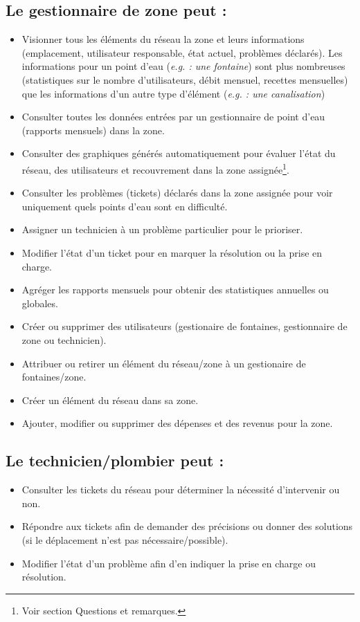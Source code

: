\documentclass[a4paper, 11pt]{article}
\begin{document}
\subsection{Le gestionnaire de zone peut :}
\begin{itemize}
  \item Visionner tous les éléments du réseau la zone et leurs informations (emplacement, utilisateur responsable, état actuel, problèmes déclarés). Les informations pour un point d'eau (\emph{e.g. : une fontaine}) sont plus nombreuses (statistiques sur le nombre d'utilisateurs, débit mensuel, recettes mensuelles) que les informations d'un autre type d'élément (\emph{e.g. : une canalisation})
  \item Consulter toutes les données entrées par un gestionnaire de point d'eau (rapports mensuels) dans la zone.
  \item Consulter des graphiques générés automatiquement pour évaluer l'état du réseau, des utilisateurs et recouvrement dans la zone assignée\footnote{Voir section Questions et remarques.}.
  \item Consulter les problèmes (tickets) déclarés dans la zone assignée pour voir uniquement quels points d'eau sont en difficulté.
  \item Assigner un technicien à un problème particulier pour le prioriser.
  \item Modifier l'état d'un ticket pour en marquer la résolution ou la prise en charge.
  \item Agréger les rapports mensuels pour obtenir des statistiques annuelles ou globales. %
  \item Créer ou supprimer des utilisateurs (gestionaire de fontaines, gestionnaire de zone ou technicien). %
  \item Attribuer ou retirer un élément du réseau/zone à un gestionaire de fontaines/zone.
  \item Créer un élément du réseau dans sa zone.
  \item Ajouter, modifier ou supprimer des dépenses et des revenus pour la zone.
\end{itemize}

\subsection{Le technicien/plombier peut :}
\begin{itemize}
  \item Consulter les tickets du réseau pour déterminer la nécessité d'intervenir ou non.
  \item Répondre aux tickets afin de demander des précisions ou donner des solutions (si le déplacement n'est pas nécessaire/possible).
  \item Modifier l'état d'un problème afin d'en indiquer la prise en charge ou résolution.
\end{itemize}
\end{document}
